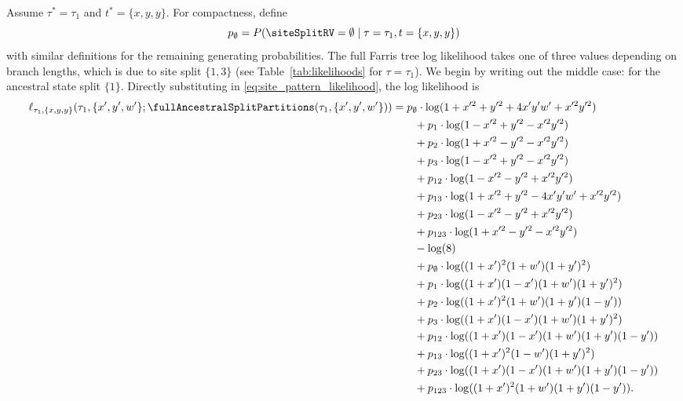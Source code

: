 Assume $\tau^*=\tau_1$ and $t^*=\{x,y,y\}$.
For compactness, define
$$
p_{\emptyset} = P(\siteSplitRV=\emptyset \mid \tau=\tau_1,t=\{x,y,y\})
$$
with similar definitions for the remaining generating probabilities.
The full Farris tree log likelihood takes one of three values depending on branch lengths, which is due to site split $\{1,3\}$ (see Table~\ref{tab:likelihoods} for $\tau = \tau_1$).
We begin by writing out the middle case: for the ancestral state split $\{1\}$.
Directly substituting in \eqref{eq:site_pattern_likelihood}, the log likelihood is
\begin{align}
    \label{eq:farris_likelihood}
    \ell_{\tau_1,\{x,y,y\}}(\tau_1, \{x',y',w'\}; \fullAncestralSplitPartitions(\tau_1,\{x',y',w'\}))
    &=        p_{\emptyset}  \cdot\log(1+x'^2+y'^2+4x'y'w'+x'^2y'^2) \nonumber \\
    &\qquad + p_{1}          \cdot\log(1-x'^2+y'^2-x'^2y'^2) \nonumber \\
    &\qquad + p_{2}          \cdot\log(1+x'^2-y'^2-x'^2y'^2) \nonumber \\
    &\qquad + p_{3}          \cdot\log(1-x'^2+y'^2-x'^2y'^2) \nonumber \\
    &\qquad + p_{12}         \cdot\log(1-x'^2-y'^2+x'^2y'^2) \nonumber \\
    &\qquad + p_{13}         \cdot\log(1+x'^2+y'^2-4x'y'w'+x'^2y'^2) \nonumber \\
    &\qquad + p_{23}         \cdot\log(1-x'^2-y'^2+x'^2y'^2) \nonumber \\
    &\qquad + p_{123}        \cdot\log(1+x'^2-y'^2-x'^2y'^2) \nonumber \\
    &\qquad - \log(8) \nonumber \\
    &\qquad + p_{\emptyset}  \cdot\log((1+x')^2   (1+w')(1+y')^2) \nonumber \\
    &\qquad + p_{1}          \cdot\log((1+x')(1-x')(1+w')(1+y')^2) \nonumber \\
    &\qquad + p_{2}          \cdot\log((1+x')^2   (1+w')(1+y')(1-y')) \nonumber \\
    &\qquad + p_{3}          \cdot\log((1+x')(1-x')(1+w')(1+y')^2) \nonumber \\
    &\qquad + p_{12}         \cdot\log((1+x')(1-x')(1+w')(1+y')(1-y')) \nonumber \\
    &\qquad + p_{13}         \cdot\log((1+x')^2   (1-w')(1+y')^2) \nonumber \\
    &\qquad + p_{23}         \cdot\log((1+x')(1-x')(1+w')(1+y')(1-y')) \nonumber \\
    &\qquad + p_{123}        \cdot\log((1+x')^2   (1+w')(1+y')(1-y')).
\end{align}
